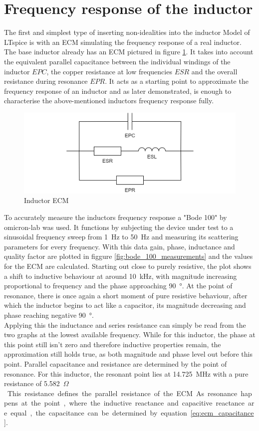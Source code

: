 \section{Frequency response of the inductor} \label{sec:frequency_response_of_the_inductor}
The first and simplest type of inserting non-idealities into the inductor Model of LTspice is with an \ac{ECM} simulating the frequency response of a real inductor. The base inductor already has an \ac{ECM} pictured in figure \ref{fig:inductor_ecm}. It takes into account the equivalent parallel capacitance between the individual windings of the inductor $EPC$, the copper resistance at low frequencies $ESR$ and the overall resistance during resonance $EPR$. It acts as a starting point to approximate the frequency response of an inductor and as later demonstrated, is enough to characterise the above-mentioned inductors frequency response fully.
\begin{figure}[H]
    \centering
    \includegraphics[width=0.70\linewidth]{Bilder//Kapitel3/Inductor_ECM.png}
    \caption{Inductor \ac{ECM}}
    \label{fig:inductor_ecm}
\end{figure}
To accurately measure the inductors frequency response a "Bode 100" by omicron-lab was used. It functions by subjecting the device under test to a sinusoidal frequency sweep from \SI{1}{\Hz} to \SI{50}{\Hz} and measuring its scattering parameters for every frequency. With this data gain, phase, inductance and quality factor are plotted in figgure \ref{fig:bode_100_measurements} and the values for the \ac{ECM} are calculated. Starting out close to purely resistive, the plot shows a shift to inductive behaviour at around \SI{10}{\kilo\Hz}, with magnitude increasing proportional to frequency and the phase approaching \SI{90}{\degree}. At the point of resonance, there is once again a short moment of pure resistive behaviour, after which the inductor begins to act like a capacitor, its magnitude decreasing and phase reaching negative \SI{90}{\degree}.\\
Applying this the inductance and series resistance can simply be read from the two graphs at the lowest available frequency. While for this inductor, the phase at this point still isn't zero and therefore inductive properties remain, the approximation still holds true, as both magnitude and phase level out before this point. Parallel capacitance and resistance are determined by the point of resonance. For this inductor, the resonant point lies at \SI{14,725}{\mega\Hz} with a pure resistance of \SI{5,582}{\kilo$\Omega$}. This resistance defines the parallel resistance of the \ac{ECM}. As resonance happens at the point, where the inductive reactance and capacitive reactance are equal, the capacitance can be determined by equation \ref{eq:ecm_capacitance}.

